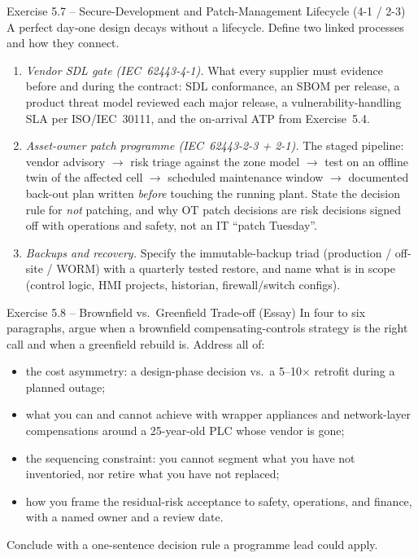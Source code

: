 \documentclass[11pt,a4paper]{article}
\begin{document}
\begin{taskbox}{Exercise 5.7 -- Secure-Development and Patch-Management Lifecycle (4-1 / 2-3)}
A perfect day-one design decays without a lifecycle. Define two linked processes and how they connect.
\begin{enumerate}
  \item \emph{Vendor SDL gate (IEC~62443-4-1).} What every supplier must evidence before and during the contract: SDL conformance, an SBOM per release, a product threat model reviewed each major release, a vulnerability-handling SLA per ISO/IEC~30111, and the on-arrival ATP from Exercise~5.4.
  \item \emph{Asset-owner patch programme (IEC~62443-2-3 + 2-1).} The staged pipeline: vendor advisory $\to$ risk triage against the zone model $\to$ test on an offline twin of the affected cell $\to$ scheduled maintenance window $\to$ documented back-out plan written \emph{before} touching the running plant. State the decision rule for \emph{not} patching, and why OT patch decisions are risk decisions signed off with operations and safety, not an IT ``patch Tuesday''.
  \item \emph{Backups and recovery.} Specify the immutable-backup triad (production / off-site / WORM) with a quarterly tested restore, and name what is in scope (control logic, HMI projects, historian, firewall/switch configs).
\end{enumerate}
\end{taskbox}

\begin{taskbox}{Exercise 5.8 -- Brownfield vs.\ Greenfield Trade-off (Essay)}
In four to six paragraphs, argue when a brownfield compensating-controls strategy is the right call and when a greenfield rebuild is. Address all of:
\begin{itemize}\setlength{\itemsep}{1pt}
  \item the cost asymmetry: a design-phase decision vs.\ a 5--10$\times$ retrofit during a planned outage;
  \item what you can and cannot achieve with wrapper appliances and network-layer compensations around a 25-year-old PLC whose vendor is gone;
  \item the sequencing constraint: you cannot segment what you have not inventoried, nor retire what you have not replaced;
  \item how you frame the residual-risk acceptance to safety, operations, and finance, with a named owner and a review date.
\end{itemize}
Conclude with a one-sentence decision rule a programme lead could apply.
\end{taskbox}
\end{document}
